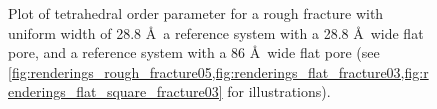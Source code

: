 %
\begin{figure}[!p]%
    \centering%
    {
        \captionsetup{width=\textwidth} 
        \caption{%
            Plot of tetrahedral order parameter for a rough fracture with uniform width of 28.8 \AA\, a reference system with a 28.8 \AA\ wide flat pore, and a reference system with a 86 \AA\ wide flat pore (see \cref{fig:renderings_rough_fracture05,fig:renderings_flat_fracture03,fig:renderings_flat_square_fracture03} for illustrations).%
        }%
    }
\end{figure}%
